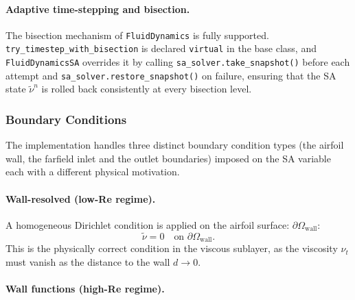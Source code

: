 \paragraph{Adaptive time-stepping and bisection.}

The bisection mechanism of \texttt{FluidDynamics} is fully supported.\\

\texttt{try\_timestep\_with\_bisection} is declared \texttt{virtual} in the
base class, and \texttt{FluidDynamicsSA} overrides it by calling
\texttt{sa\_solver.take\_snapshot()} before each attempt and
\texttt{sa\_solver.restore\_snapshot()} on failure, ensuring that the SA
state $\tilde{\nu}^n$ is rolled back consistently at every bisection level.

\subsubsection{Boundary Conditions}
\label{sec:02_bc}

The implementation handles three distinct boundary condition types (the airfoil wall, the farfield inlet and the outlet boundaries) imposed on the SA variable each with a different physical motivation.

\paragraph{Wall-resolved (low-Re regime).}
A homogeneous Dirichlet condition is applied on the airfoil surface:
$\partial\Omega_\text{wall}$:
\begin{equation}
  \tilde{\nu} = 0 \quad \text{on } \partial\Omega_\text{wall}.
\end{equation}
This is the physically correct condition in the viscous sublayer, as the viscosity $\nu_t$ must vanish as the distance to the wall $d \to 0$.

\paragraph{Wall functions (high-Re regime).}

